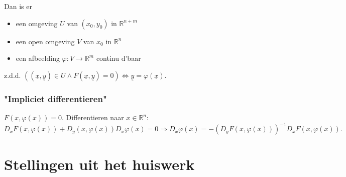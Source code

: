 \documentclass[a4paper]{exam}
\theoremstyle{definition}
\newcommand{\reals}{\mathbb{R}}
\begin{document}
				Dan is er \begin{itemize}
					\item[] een omgeving $ U $ van $ (x_0,y_0) $ in $ \reals^{n+m} $
					\item[] een open omgeving $V$ van $x_0$ in $\reals^n$
					\item[] een afbeelding $ \varphi : V\rightarrow \reals^m $ continu d'baar 
				\end{itemize}
				z.d.d. $ ((\underline{x},\underline{y}) \in U \wedge F(\underline{x},\underline{y})=0) \Leftrightarrow \underline{y}=\varphi (\underline{x}). $
				
			\subsubsection{"Impliciet differentieren"}
				$ F(x,\varphi(x))=0 $. Differentieren naar $ x\in \reals^n $:
				\[ D_x F(x,\varphi(x)) + D_y (x,\varphi(x))D_x \varphi(x) = 0 \Rightarrow D_x \varphi(x) = -(D_y F(x,\varphi(x)))^{-1} D_x F(x,\varphi(x)). \]
				
		\section{Stellingen uit het huiswerk}
			
		
		
\end{document}
